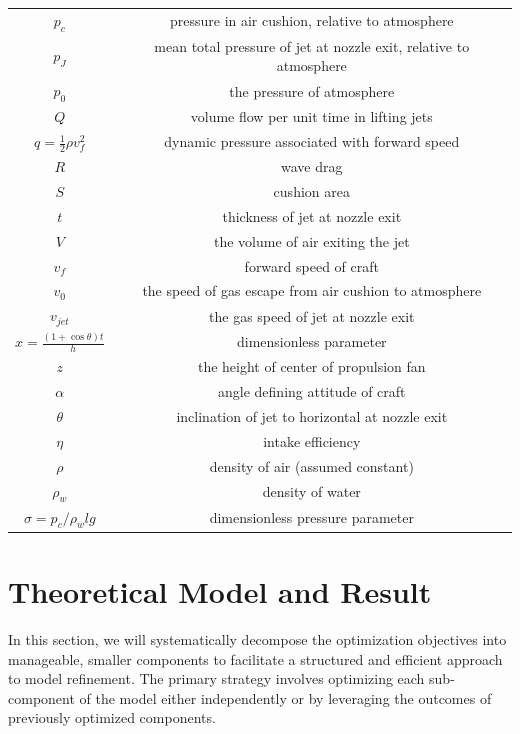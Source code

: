 \begin{table}
\begin{ruledtabular}
\begin{tabular}{cc}
$p_c$ & pressure in air cushion, relative to atmosphere \\
$p_J$ & mean total pressure of jet at nozzle exit, relative to 
atmosphere \\
$p_0$ & the pressure of atmosphere \\
$Q$ & volume flow per unit time in lifting jets \\
$q = \frac{1}{2}\rho v_f^2$ & dynamic pressure associated with forward speed \\
$R$ & wave drag \\
$S$ & cushion area \\
$t$ & thickness of jet at nozzle exit \\
$V$ & the volume of air exiting the jet \\
$v_f$ & forward speed of craft \\
$v_0$ & the speed of gas escape from air cushion to atmosphere \\
$v_{jet}$ & the gas speed of jet at nozzle exit\\ 

$x = \frac{(1+\cos\theta)t}{h}$ & dimensionless parameter \\
$z$ & the height of center of propulsion fan \\
$\alpha$ & angle defining attitude of craft \\

$\theta$ & inclination of jet to horizontal at nozzle exit \\
$\eta$ & intake efficiency \\
$\rho$ & density of air (assumed constant) \\
$\rho_w$ & density of water \\
$\sigma = p_c/\rho_w l g$ & dimensionless pressure parameter \\

\end{tabular}
\end{ruledtabular}
\end{table}


\section{Theoretical Model and Result}
In this section, we will systematically decompose the optimization objectives into manageable, smaller components to facilitate a structured and efficient approach to model refinement. The primary strategy involves optimizing each sub-component of the model either independently or by leveraging the outcomes of previously optimized components. 

